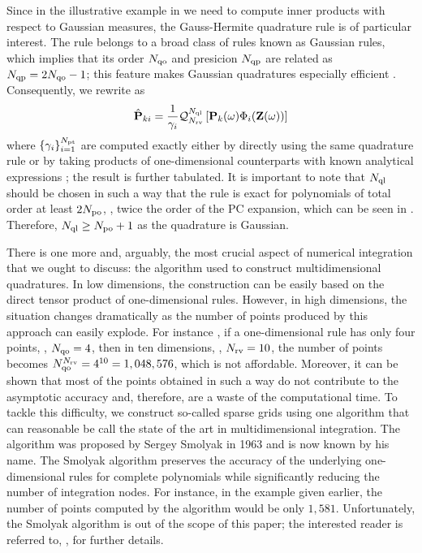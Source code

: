 Since in the illustrative example in  we need to compute inner products with respect to Gaussian measures, the Gauss-Hermite quadrature rule is of particular interest. The rule belongs to a broad class of rules known as Gaussian rules, which implies that its order $N_\text{qo}$ and presicion $N_\text{qp}$ are related as $N_\text{qp} = 2 N_\text{qo} - 1$; this feature makes Gaussian quadratures especially efficient \cite{heiss2008}. Consequently, we rewrite  as
\[
  \hat{\mathbf{P}}_{ki} = \frac{1}{\gamma_i} \mathcal{Q}_{{N_\text{rv}}}^{N_\text{ql}}\left[\mathbf{P}_k(\omega) \Phi_i(\mathbf{Z}(\omega))\right]
\]
where $\{ \gamma_i \}_{i = 1}^{{N_\text{pt}}}$ are computed exactly either by directly using the same quadrature rule or by taking products of one-dimensional counterparts with known analytical expressions \cite{xiu2010}; the result is further tabulated. It is important to note that $N_\text{ql}$ should be chosen in such a way that the rule is exact for polynomials of total order at least $2 {N_\text{po}}$, \ie, twice the order of the PC expansion, which can be seen in  \cite{eldred2009}. Therefore, $N_\text{ql} \geq {N_\text{po}} + 1$ as the quadrature is Gaussian.

There is one more and, arguably, the most crucial aspect of numerical integration that we ought to discuss: the algorithm used to construct multidimensional quadratures. In low dimensions, the construction can be easily based on the direct tensor product of one-dimensional rules. However, in high dimensions, the situation changes dramatically as the number of points produced by this approach can easily explode. For instance \cite{heiss2008}, if a one-dimensional rule has only four points, \ie, $N_\text{qo} = 4$, then in ten dimensions, \ie, ${N_\text{rv}} = 10$, the number of points becomes $N_\text{qo}^{{N_\text{rv}}} = 4^{10} = 1,048,576$, which is not affordable. Moreover, it can be shown that most of the points obtained in such a way do not contribute to the asymptotic accuracy and, therefore, are a waste of the computational time. To tackle this difficulty, we construct so-called sparse grids using one algorithm that can reasonable be call the state of the art in multidimensional integration. The algorithm was proposed by Sergey Smolyak in 1963 and is now known by his name. The Smolyak algorithm preserves the accuracy of the underlying one-dimensional rules for complete polynomials while significantly reducing the number of integration nodes. For instance, in the example given earlier, the number of points computed by the algorithm would be only $1,581$. Unfortunately, the Smolyak algorithm is out of the scope of this paper; the interested reader is referred to, \eg, \cite{eldred2009, maitre2010, heiss2008} for further details.
